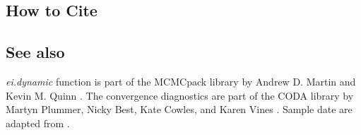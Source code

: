 \subsection*{How to Cite}


\subsection*{See also}
\emph{ei.dynamic} function is part of the MCMCpack library by Andrew D. Martin and Kevin M. Quinn \citep{MarQui05}.
The convergence diagnostics are part of the CODA library by Martyn Plummer, Nicky Best, Kate Cowles, and Karen Vines \citep{PluBesCowVin05}. Sample date are adapted from \cite{MarQui05}.
